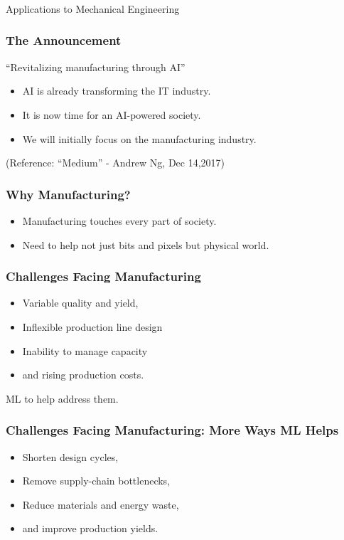 \begin{frame}[fragile]\frametitle{}
\begin{center}
{\Large Applications to Mechanical Engineering}
\end{center}
\end{frame}

\begin{frame}[fragile]\frametitle{The Announcement}
\begin{center}
{\Large ``Revitalizing manufacturing through AI''}
\end{center}
\begin{itemize}
\item AI is already transforming the IT industry.
\item It is now time for an AI-powered society.
\item We will initially focus on the manufacturing industry.
\end{itemize}

\tiny{(Reference: ``Medium'' - Andrew Ng, Dec 14,2017)}
\end{frame}

\begin{frame}[fragile]\frametitle{Why Manufacturing?}
\begin{itemize}
\item Manufacturing touches every part of society.
\item Need to help not just bits and pixels but physical world.
\end{itemize}

\end{frame}

\begin{frame}[fragile]\frametitle{Challenges Facing Manufacturing}
\begin{itemize}
\item Variable quality and yield,
\item Inflexible production line design
\item Inability to manage capacity
\item and rising production costs.
\end{itemize}
ML to help address them.
\end{frame}

\begin{frame}[fragile]\frametitle{Challenges Facing Manufacturing: More Ways ML Helps}
\begin{itemize}
\item Shorten design cycles,
\item Remove supply-chain bottlenecks,
\item Reduce materials and energy waste,
\item and improve production yields.
\end{itemize}

\end{frame}


